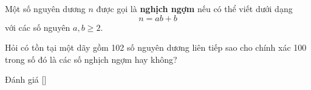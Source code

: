 \ifshowproblem
\begin{problem}\label{problem:GER-2015-TST-P2}
    Một số nguyên dương \( n \) được gọi là \textbf{nghịch ngợm} nếu có thể viết dưới dạng
    \[
        n = ab + b
    \]
    với các số nguyên \( a, b \geq 2 \).

    Hỏi có tồn tại một dãy gồm 102 số nguyên dương liên tiếp sao cho chính xác 100 trong số đó là các số nghịch ngợm hay không?
\end{problem}
\fi

\ifshowinfo
Đánh giá [\textbf{}]\footnotemark
{}
\fi